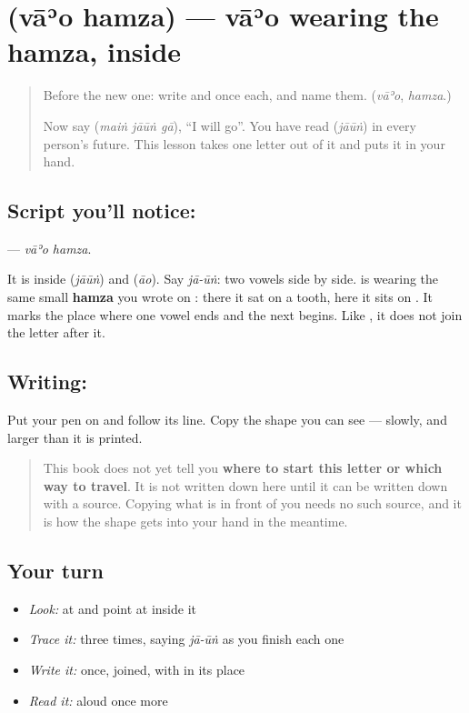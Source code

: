 \section[\texorpdfstring{\ur{ؤ} (vāʾo hamza)}{ؤ (vāʾo hamza)}]{ (vāʾo hamza) — vāʾo wearing the hamza, inside }

\label{lesson:UR-W265-waw-hamza}



\begin{quote}
Before the new one: write \textbf{} and \textbf{} once each, and name them. (\emph{vāʾo}, \emph{hamza}.)

Now say \textbf{  } (\emph{maiṅ jāūṅ gā}), \textquotedblleft{}I will go\textquotedblright{}. You have read \textbf{} (\emph{jāūṅ}) in every person's future. This lesson takes one letter out of it and puts it in your hand.
\end{quote}

\subsection*{Script you'll notice: }
\textbf{} — \emph{vāʾo hamza}.

It is inside \textbf{} (\emph{jāūṅ}) and \textbf{} (\emph{āo}). Say \emph{jā-ūṅ}: two vowels side by side. \textbf{} is \textbf{} wearing the same small \textbf{hamza} you wrote on \textbf{}: there it sat on a tooth, here it sits on \textbf{}. It marks the place where one vowel ends and the next begins. Like \textbf{}, it does not join the letter after it.

\subsection*{Writing: }
Put your pen on  and follow its line. Copy the shape you can see — slowly, and larger than it is printed.

\begin{quote}
This book does not yet tell you \textbf{where to start this letter or which way to travel}. It is not written down here until it can be written down with a source. Copying what is in front of you needs no such source, and it is how the shape gets into your hand in the meantime.
\end{quote}

\subsection*{Your turn}
\begin{itemize}
\raggedright
  \item \emph{Look:} at \textbf{} and point at  inside it
  \item \emph{Trace it:}  three times, saying \emph{jā-ūṅ} as you finish each one
  \item \emph{Write it:} \textbf{} once, joined, with  in its place
  \item \emph{Read it:} \textbf{} aloud once more
\end{itemize}

